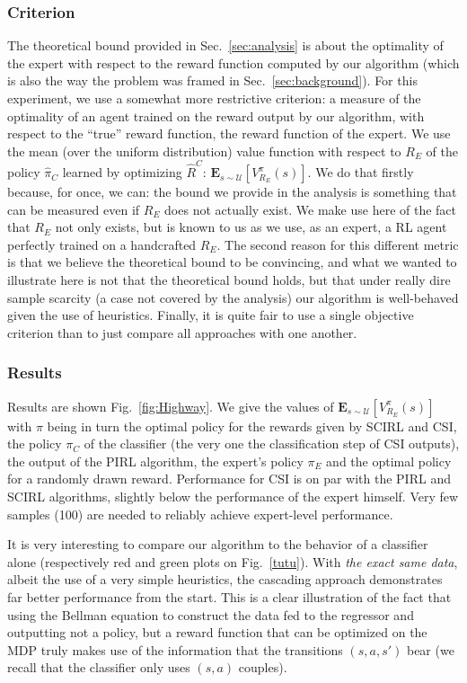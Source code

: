 \documentclass[smallextended]{svjour3}
\begin{document}
\subsubsection{Criterion}
\label{subsubsec:hcriterion}
The theoretical bound provided in Sec.~\ref{sec:analysis} is about the optimality of the expert with respect to the reward function computed by our algorithm (which is also the way the problem was framed in Sec.~\ref{sec:background}). For this experiment, we use a somewhat more restrictive criterion: a measure of the optimality of an agent trained on the reward output by our algorithm, with respect to the ``true'' reward function, the reward function of the expert. We use the mean (over the uniform distribution) value function with respect to $R_E$ of the policy $\hat \pi_C$ learned by optimizing $\hat R^C$: $\mathbf{E}_{s\sim\mathcal{U}}[V^{\pi}_{R_E}(s)]$. We do that firstly because, for once, we can: the bound we provide in the analysis is something that can be measured even if $R_E$ does not actually exist. We make use here of the fact that $R_E$ not only exists, but is known to us as we use, as an expert, a RL agent perfectly trained on a handcrafted $R_E$. The second reason for this different metric is that we believe the theoretical bound to be convincing, and what we wanted to illustrate here is not that the theoretical bound holds, but that under really dire sample scarcity (a case not covered by the analysis) our algorithm is well-behaved given the use of heuristics. Finally, it is quite fair to use a single objective criterion than to just compare all approaches with one another.

\subsubsection{Results}
\label{subsubsec:hresults}
Results are shown Fig.~\ref{fig:Highway}. We give the values of $\mathbf{E}_{s\sim\mathcal{U}}[V^{\pi}_{R_E}(s)]$ with $\pi$ being in turn the optimal policy for the rewards given by SCIRL and CSI, the policy $\pi_C$ of the classifier (the very one the classification step of CSI outputs), the output of the PIRL algorithm, the expert's policy $\pi_E$ and the optimal policy for a randomly drawn reward. Performance for CSI is on par with the PIRL and SCIRL algorithms, slightly below the performance of the expert himself. Very few samples (100) are needed to reliably achieve expert-level performance.

It is very interesting to compare our algorithm to the behavior of a classifier alone (respectively red and green plots on Fig.~\ref{tutu}). With \emph{the exact same data}, albeit the use of a very simple heuristics, the cascading approach demonstrates far better performance from the start. This is a clear illustration of the fact that using the Bellman equation to construct the data fed to the regressor and outputting not a policy, but a reward function that can be optimized on the MDP truly makes use of the information that the transitions $(s,a,s')$ bear (we recall that the classifier only uses $(s,a)$ couples).
\end{document}
